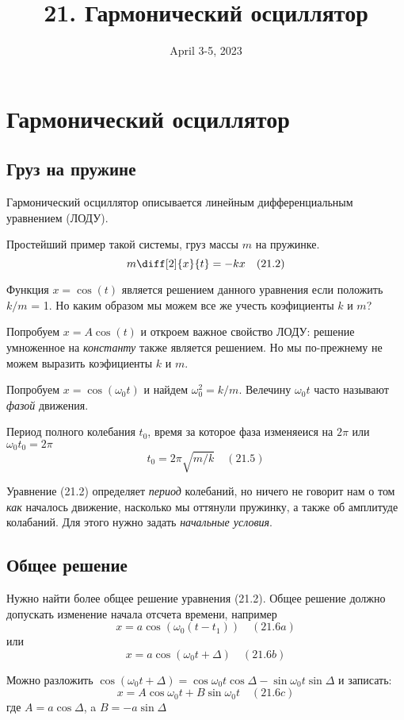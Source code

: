 \documentclass[12pt]{article}
\date{April 3-5, 2023}
\title{21. Гармонический осциллятор}
\begin{document}
\maketitle

\section{Гармонический осциллятор}

\subsection{Груз на пружине}

Гармонический осциллятор описывается линейным дифференциальным уравнением (ЛОДУ).

Простейший пример такой системы, груз массы $m$ на пружинке.
\[
m\diff[2]{x}{t}=-kx \quad (21.2)
\]

Функция $x=\cos(t)$ является решением данного уравнения если положить $k/m$ = 1.
Но каким образом мы можем все же учесть коэфициенты $k$ и $m$?

Попробуем $x=A\cos(t)$ и откроем важное свойство ЛОДУ: решение умноженное на \textit{константу} также является решением. Но мы по-прежнему не можем выразить коэфициенты $k$ и $m$.

Попробуем $x=\cos(\omega_0 t)$ и найдем $\omega_0^2=k/m$. Велечину $\omega_0 t$ часто называют \textit{фазой} движения.

Период полного колебания $t_0$, время за которое фаза изменяеися на $2\pi$ или $\omega_0t_0=2\pi$
\[
    t_0=2\pi\sqrt{m/k} \quad (21.5)
\]

Уравнение (21.2) определяет \textit{период} колебаний, но ничего не говорит нам о том \textit{как} началось движение, насколько мы оттянули пружинку, а также об амплитуде колабаний. Для этого нужно задать \textit{начальные условия}.

\subsection{Общее решение}

Нужно найти более общее решение уравнения (21.2). Общее решение должно допускать изменение начала отсчета времени, например
\[
    x=a\cos(\omega_0(t-t_1)) \quad (21.6a)
\]
или
\[
    x=a\cos(\omega_0t+\Delta) \quad (21.6b)
\]

Можно разложить $\cos(\omega_0t+\Delta)=\cos\omega_0t\cos\Delta-\sin\omega_0t\sin\Delta$ и записать:
\[
    x=A\cos\omega_0t+B\sin\omega_0t \quad (21.6c)
\]
где $A=a\cos\Delta$, a $B=-a\sin\Delta$
\end{document}
